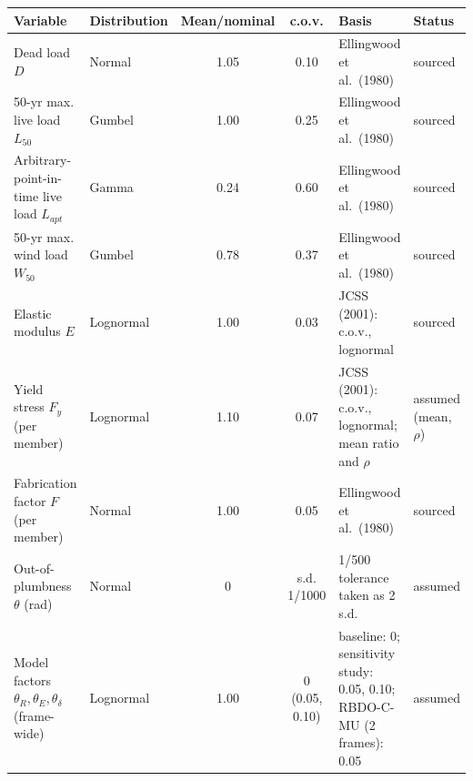 \begin{tabular}{llccll}
\toprule
Variable & Distribution & Mean/nominal & c.o.v. & Basis & Status \\
\midrule
Dead load $D$ & Normal & 1.05 & 0.10 & Ellingwood et al.\ (1980) & sourced \\
50-yr max. live load $L_{50}$ & Gumbel & 1.00 & 0.25 & Ellingwood et al.\ (1980) & sourced \\
Arbitrary-point-in-time live load $L_{apt}$ & Gamma & 0.24 & 0.60 & Ellingwood et al.\ (1980) & sourced \\
50-yr max. wind load $W_{50}$ & Gumbel & 0.78 & 0.37 & Ellingwood et al.\ (1980) & sourced \\
Elastic modulus $E$ & Lognormal & 1.00 & 0.03 & JCSS (2001): c.o.v., lognormal & sourced \\
Yield stress $F_y$ (per member) & Lognormal & 1.10 & 0.07 & JCSS (2001): c.o.v., lognormal; mean ratio and $\rho$ & assumed (mean, $\rho$) \\
Fabrication factor $F$ (per member) & Normal & 1.00 & 0.05 & Ellingwood et al.\ (1980) & sourced \\
Out-of-plumbness $\theta$ (rad) & Normal & 0 & s.d. 1/1000 & 1/500 tolerance taken as 2 s.d. & assumed \\
\midrule
Model factors $\theta_R,\theta_E,\theta_\delta$ (frame-wide) & Lognormal & 1.00 & 0 (0.05, 0.10) & baseline: 0; sensitivity study: 0.05, 0.10; RBDO-C-MU (2 frames): 0.05 & assumed \\
\bottomrule
\end{tabular}